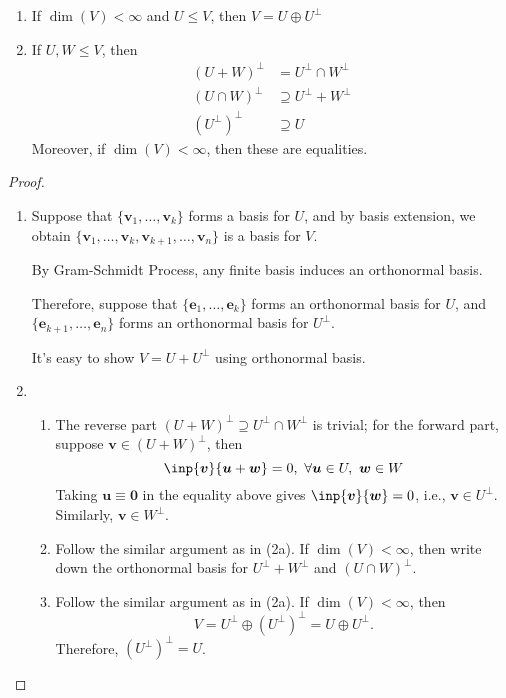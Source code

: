 \begin{proposition}\label{pro:10:2}
\begin{enumerate}
\item
If $\dim(V)<\infty$ and $U\le V$, then $V=U\oplus U^\perp$
\item
If $U,W\le V$, then
\begin{align*}
(U+W)^\perp&=U^\perp\cap W^\perp\\
(U\cap W)^\perp&\supseteq U^\perp +W^\perp\\
(U^\perp)^\perp&\supseteq U
\end{align*}
Moreover, if $\dim(V)<\infty$, then these are equalities.
\end{enumerate}
\end{proposition}
\begin{proof}
\begin{enumerate}
\item
Suppose that $\{\bm v_1,\dots,\bm v_k\}$ forms a basis for $U$, and by basis extension, we obtain $\{\bm v_1,\dots,\bm v_k,\bm v_{k+1},\dots,\bm v_n\}$ is a basis for $V$.

By Gram-Schmidt Process, any finite basis induces an orthonormal basis. 

Therefore, suppose that $\{\bm e_1,\dots,\bm e_k\}$ forms an orthonormal basis for $U$, and $\{\bm e_{k+1},\dots,\bm e_{n}\}$ forms an orthonormal basis for $U^\perp$.

It's easy to show $V=U+U^\perp$ using orthonormal basis.
\item
\begin{enumerate}
\item
The reverse part $(U+W)^\perp\supseteq U^\perp\cap W^\perp$ is trivial;
for the forward part, suppose $\bm v\in(U+W)^\perp$, then 
\[
\inp{\bm v}{\bm u+\bm w}=0,\ \forall\bm u\in U,\ \bm w\in W
\]  
Taking $\bm u\equiv\bm0$ in the equality above gives $\inp{\bm v}{\bm w}=0$, i.e., $\bm v\in U^\perp$.
Similarly, $\bm v\in W^\perp$.
\item
Follow the similar argument as in (2a).
If $\dim(V)<\infty$, then write down the orthonormal basis for $U^\perp+W^\perp$ and $(U\cap W)^\perp$.
\item
Follow the similar argument as in (2a).
If $\dim(V)<\infty$, then 
\[
V=U^\perp\oplus (U^\perp)^\perp=U\oplus U^\perp.
\]
Therefore, $(U^\perp)^\perp=U$.
\end{enumerate}
\end{enumerate}
\end{proof}

